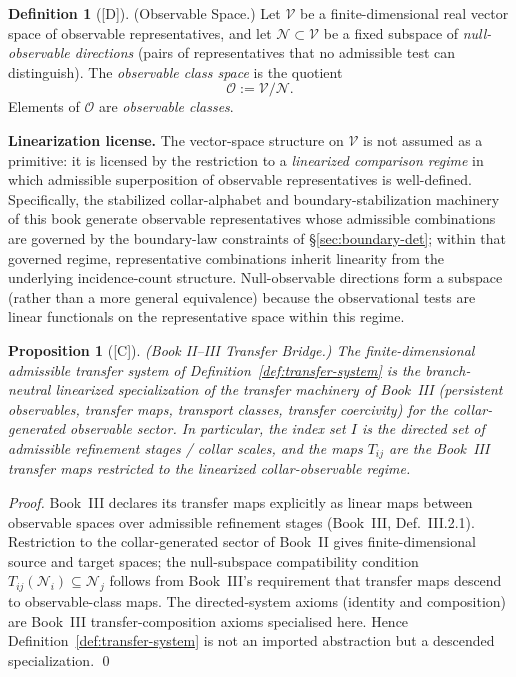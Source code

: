 \documentclass[12pt,oneside]{amsbook}
\theoremstyle{plain}
\newtheorem{proposition}[theorem]{Proposition}
\theoremstyle{definition}
\newtheorem{definition}[theorem]{Definition}
\theoremstyle{remark}
\newcommand{\status}[1]{\textup{[#1]}}
\begin{document}
\begin{definition}[\status{D}]\label{def:observable-space}
\textup{(Observable Space.)}
Let $\mathcal{V}$ be a finite-dimensional real vector space of
observable representatives, and let $\mathcal{N} \subset \mathcal{V}$
be a fixed subspace of \emph{null-observable directions} (pairs of
representatives that no admissible test can distinguish).  The
\emph{observable class space} is the quotient
\[
  \mathcal{O} := \mathcal{V} / \mathcal{N}.
\]
Elements of $\mathcal{O}$ are \emph{observable classes}.

\textbf{Linearization license.}  The vector-space structure on
$\mathcal{V}$ is not assumed as a primitive: it is licensed by the
restriction to a \emph{linearized comparison regime} in which
admissible superposition of observable representatives is well-defined.
Specifically, the stabilized collar-alphabet and boundary-stabilization
machinery of this book generate observable representatives whose
admissible combinations are governed by the boundary-law constraints of
\S\ref{sec:boundary-det}; within that governed regime, representative
combinations inherit linearity from the underlying incidence-count
structure.  Null-observable directions form a subspace (rather than a
more general equivalence) because the observational tests are linear
functionals on the representative space within this regime.
\end{definition}

\begin{proposition}[\status{C}]\label{prop:book2-book3-bridge}
\textup{(Book II--III Transfer Bridge.)}
The finite-dimensional admissible transfer system of
Definition~\ref{def:transfer-system} is the branch-neutral linearized
specialization of the transfer machinery of Book~III (persistent
observables, transfer maps, transport classes, transfer coercivity) for
the collar-generated observable sector.  In particular, the index set
$I$ is the directed set of admissible refinement stages / collar scales,
and the maps $T_{ij}$ are the Book~III transfer maps restricted to the
linearized collar-observable regime.
\end{proposition}

\begin{proof}
Book~III declares its transfer maps explicitly as linear maps between
observable spaces over admissible refinement stages (Book~III,
Def.~III.2.1).  Restriction to the collar-generated sector of Book~II
gives finite-dimensional source and target spaces; the null-subspace
compatibility condition $T_{ij}(\mathcal{N}_i) \subseteq \mathcal{N}_j$
follows from Book~III's requirement that transfer maps descend to
observable-class maps.  The directed-system axioms (identity and
composition) are Book~III transfer-composition axioms specialised here.
Hence Definition~\ref{def:transfer-system} is not an imported
abstraction but a descended specialization. \qed
\end{proof}
\end{document}

